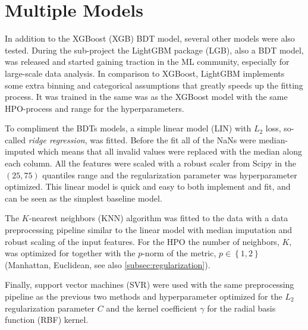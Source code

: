 \FloatBarrier
\section{Multiple Models}
\label{sec:h:multiple_models}

In addition to the XGBoost \autocite{chenXGBoostScalableTree2016} (XGB) BDT model, several other models were also tested. During the sub-project the LightGBM package \autocite{keLightGBMHighlyEfficient2017} (LGB), also a BDT model, was released and started gaining traction in the ML community, especially for large-scale data analysis. In comparison to XGBoost, LightGBM implements some extra binning and categorical assumptions that greatly speeds up the fitting process. It was trained in the same was as the XGBoost model with the same HPO-process and range for the hyperparameters. 

To compliment the BDTs models, a simple linear model (LIN) with $L_2$ loss, so-called \emph{ridge regression}, was fitted. Before the fit all of the NaNs were median-imputed which means that all invalid values were replaced with the median along each column. All the features were scaled with a robust scaler from Scipy \autocite{virtanenSciPyFundamentalAlgorithms2019} in the $(25, 75)$ quantiles range and the regularization parameter was hyperparameter optimized. This linear model is quick and easy to both implement and fit, and can be seen as the simplest baseline model.

The $K$-nearest neighbors (KNN) algorithm was fitted to the data with a data preprocessing pipeline similar to the linear model with median imputation and robust scaling of the input features. For the HPO the number of neighbors, $K$, was optimized for together with the $p$-norm of the metric, $p \in \left\{ 1, 2\right\}$ (Manhattan, Euclidean, see also \autoref{subsec:regularization}).

Finally, support vector machines (SVR) were used with the same preprocessing pipeline as the previous two methods and hyperparameter optimized for the $L_2$ regularization parameter $C$ and the kernel coefficient $\gamma$ for the radial basis function (RBF) kernel. 

